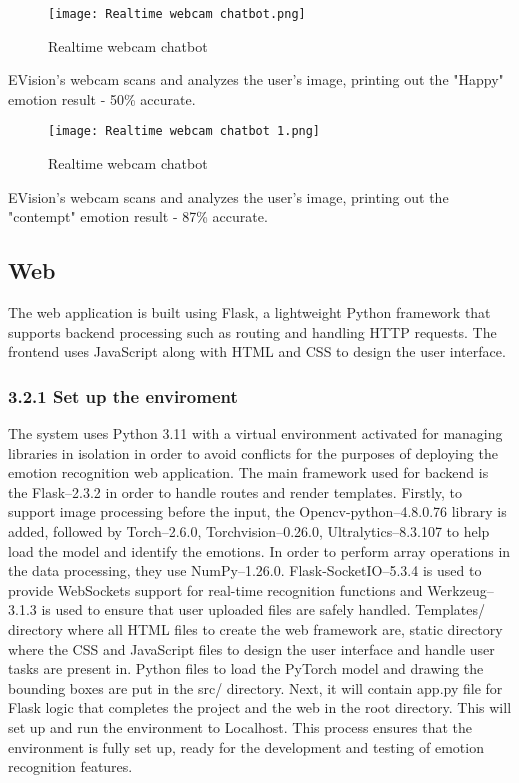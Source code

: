 \documentclass[a4paper,13pt]{report}
\begin{document}
\begin{figure}[H]
  \centering
  \texttt{[image: Realtime webcam chatbot.png]}
  \caption{Realtime webcam chatbot}
  \label{fig:method}
\end{figure}

EVision's webcam scans and analyzes the user's image, printing out the "Happy" emotion result - 50\% accurate.

\begin{figure}[H]
  \centering
  \texttt{[image: Realtime webcam chatbot 1.png]}
  \caption{Realtime webcam chatbot}
  \label{fig:method}
\end{figure}

EVision's webcam scans and analyzes the user's image, printing out the "contempt" emotion result - 87\% accurate.


\subsection{Web}
The web application is built using Flask, a lightweight Python framework that supports backend processing such as routing and handling HTTP requests. The frontend uses JavaScript along with HTML and CSS to design the user interface.

\subsubsection{3.2.1 Set up the enviroment}
The system uses Python 3.11 with a virtual environment activated for managing libraries in isolation in order to avoid conflicts for the purposes of deploying the emotion recognition web application. The main framework used for backend is the Flask--2.3.2 in order to handle routes and render templates. Firstly, to support image processing before the input, the Opencv-python--4.8.0.76 library is added, followed by Torch--2.6.0, Torchvision--0.26.0, Ultralytics--8.3.107 to help load the model and identify the emotions. In order to perform array operations in the data processing, they use NumPy–1.26.0. Flask-SocketIO–5.3.4 is used to provide WebSockets support for real-time recognition functions and Werkzeug–3.1.3 is used to ensure that user uploaded files are safely handled. Templates/ directory where all HTML files to create the web framework are, static directory where the CSS and JavaScript files to design the user interface and handle user tasks are present in. Python files to load the PyTorch model and drawing the bounding boxes are put in the src/ directory. Next, it will contain app.py file for Flask logic that completes the project and the web in the root directory. This will set up and run the environment to Localhost. 
This process ensures that the environment is fully set up, ready for the development and testing of emotion recognition features.
\end{document}
